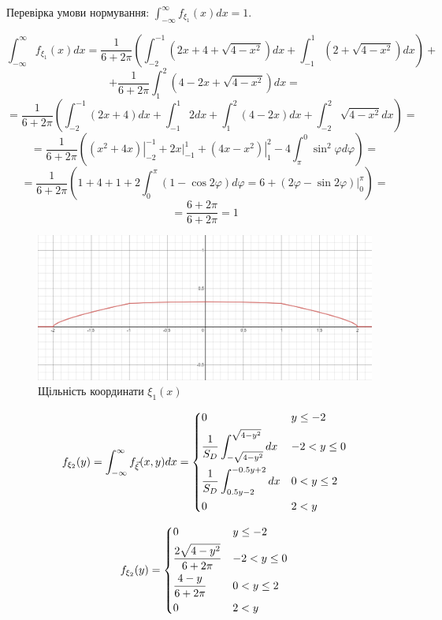 \documentclass[14pt, a4paper, ukrainian]{extreport}
\begin{document}
	Перевірка умови нормування: $\int_{-\infty}^{\infty}f_{\xi_1}(x)dx = 1$.
	
	$$ \int_{-\infty}^{\infty}f_{\xi_1}(x)dx = \dfrac{1}{6+2\pi}\left(\int_{-2}^{-1}(2x+4+\sqrt{4-x^2})dx + \int_{-1}^{1}(2+\sqrt{4-x^2})dx \right) +$$
	$$ + \dfrac{1}{6+2\pi}
	\int_{1}^{2}(4-2x+\sqrt{4-x^2})dx = $$
	$$ = \dfrac{1}{6+2\pi}\left(\int_{-2}^{-1}(2x+4)dx + \int_{-1}^{1}2dx + \int_{1}^{2}(4- 2x)dx + \int_{-2}^{2}\sqrt{4-x^2}dx\right)=$$
	$$ = \dfrac{1}{6+2\pi}\left(\left.\left(x^2 + 4x\right)\right|_{-2}^{-1} + \left.2x\right|_{-1}^{1} + \left.\left(4x - x^2\right)\right|_{1}^{2} - 4\int_{\pi}^{0}\sin^2{\varphi}d\varphi\right) = $$
	$$ = \dfrac{1}{6+2\pi}\left(1 + 4 + 1 + 2\int_{0}^{\pi}(1 -\cos{2\varphi})d\varphi = 6 + \left.(2\varphi - \sin{2\varphi})\right|_{0}^{\pi} \right)= $$
	$$ = \dfrac{6 + 2\pi}{6+2\pi} = 1
	$$
	
	\begin{figure}[H]
		\centering
		\includegraphics[width=\textwidth]{./Image/Im_06_f1.png}
		\caption{Щільність координати $\xi_1(x)$}
		\label{im:f1}
	\end{figure}
	
	$$f_{\xi_2}(y) = \int_{-\infty}^{\infty}f_{\vec\xi}(x, y)dx =
	\begin{dcases}
		0 & y \le -2\\
		\frac{1}{S_D}\int_{-\sqrt{4-y^2}}^{\sqrt{4-y^2}}dx & -2 < y \le 0\\
		\frac{1}{S_D}\int_{0.5y - 2}^{-0.5y + 2}dx & 0 < y \le 2\\
		0 & 2 < y
	\end{dcases}
	$$
		
	$$f_{\xi_2}(y) = 
	\begin{dcases}
		0 & y \le -2\\
		\dfrac{2\sqrt{4-y^2}}{6+2\pi} & -2 < y \le 0\\
		\frac{4-y}{6+2\pi} & 0 < y \le 2\\
		0 & 2 < y
	\end{dcases}
	$$
	
\end{document}
